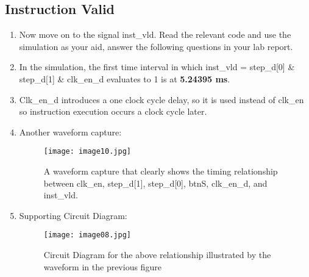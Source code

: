 \documentclass{article}
\begin{document}
\subsection*{Instruction Valid}
 \begin{enumerate}[label=\arabic*),ref=\arabic*]
 	\item Now move on to the signal inst\_vld. Read the relevant code and use the simulation as your aid, answer the following questions in your lab report.
	\item In the simulation, the first time interval in which inst\_vld = \texttildelow step\_d[0] \& step\_d[1] \& clk\_en\_d evaluates to 1 is at \textbf{5.24395 ms}. 
	\item Clk\_en\_d introduces a one clock cycle delay, so it is used instead of clk\_en so instruction execution occurs a clock cycle later.  
	\item Another waveform capture:
	\begin{figure}[H]
	\begin{center}
	\texttt{[image: image10.jpg]} 
	\caption{A waveform capture that clearly shows the timing relationship between clk\_en, step\_d[1], step\_d[0], btnS, clk\_en\_d, and inst\_vld.}
	\end{center}
	\end{figure}
	
	\item Supporting Circuit Diagram:
	\begin{figure}[H]
	\begin{center}
	\texttt{[image: image08.jpg]} 
	\caption{Circuit Diagram for the above relationship illustrated by the waveform in the previous figure}
	\end{center}
	\end{figure}
	
	
\end{enumerate}
\end{document}
